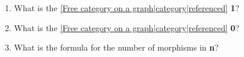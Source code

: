 
\begin{enumerate}
    \item What is the \ref{Free category on a graph|category|referenced} \textbf{1}?
    \item What is the \ref{Free category on a graph|category|referenced} \textbf{0}?
    \item What is the formula for the number of morphisms in \textbf{n}?

  \end{enumerate}